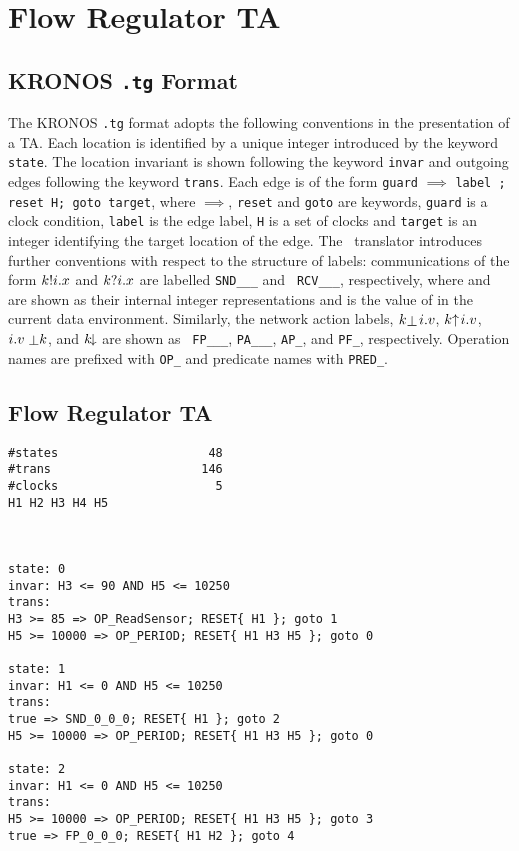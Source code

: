 \twocolumn
\chapter{Flow Regulator TA}\label{app:flowta}
{
\tiny
\section{KRONOS {\tt .tg} Format}
The KRONOS {\tt .tg} format adopts the following conventions in the
presentation of a TA. Each location is identified by a unique integer
introduced by the keyword {\tt state}. The location invariant is shown
following the keyword {\tt invar} and outgoing edges following the
keyword {\tt trans}. Each edge is of the form {\tt guard} $\implies$
{\tt label ; reset H; goto target}, where $\implies$, {\tt reset} and
{\tt goto} are keywords, {\tt guard} is a clock condition, {\tt label}
is the edge label, {\tt H} is a set of clocks and {\tt target} is an
integer identifying the target location of the edge. The \bcandle\
translator introduces further conventions with respect to the
structure of labels: communications of the form ${k}!{i}.x$ and
${k}?{i}.x$ are labelled {\tt SND\_\kk\_\ii\_\vv} and {\tt
RCV\_\kk\_\ii\_\vv}, respectively, where {\tt \kk} and {\tt \ii} are
shown as their internal integer representations and {\tt \vv} is the
value of {\tt \xx} in the current data environment. Similarly, the
network action labels, ${k}{\mathrel{\stackrel{}{\bot}}\negthinspace{i}}.{v}$, ${k}{\mathrel{\uparrow}\negthinspace{i}}.{v}$,
${{i}.{v}\mathrel{\stackrel{}{\bot}}}{k}$, and ${k}{\negthinspace\mathop{\downarrow}}$ are shown as {\tt
FP\_\kk\_\ii\_\vv}, {\tt PA\_\kk\_\ii\_\vv}, {\tt AP\_\kk},
and {\tt PF\_\kk}, respectively. Operation names are
prefixed with {\tt OP\_} and predicate names with {\tt PRED\_}.

\section{Flow Regulator TA}
\begin{verbatim}
#states                     48
#trans                     146
#clocks                      5
H1 H2 H3 H4 H5



state: 0
invar: H3 <= 90 AND H5 <= 10250
trans: 
H3 >= 85 => OP_ReadSensor; RESET{ H1 }; goto 1
H5 >= 10000 => OP_PERIOD; RESET{ H1 H3 H5 }; goto 0

state: 1
invar: H1 <= 0 AND H5 <= 10250
trans: 
true => SND_0_0_0; RESET{ H1 }; goto 2
H5 >= 10000 => OP_PERIOD; RESET{ H1 H3 H5 }; goto 0

state: 2
invar: H1 <= 0 AND H5 <= 10250
trans: 
H5 >= 10000 => OP_PERIOD; RESET{ H1 H3 H5 }; goto 3
true => FP_0_0_0; RESET{ H1 H2 }; goto 4


\end{verbatim}}
